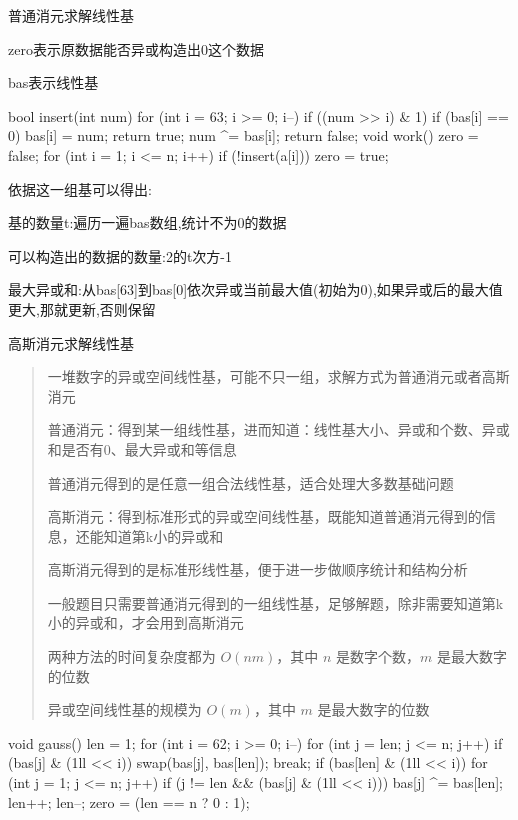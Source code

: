 \documentclass[UTF8,a4paper,11pt]{ctexart}
\newcommand{\topic}[1]{%
  \par\needspace{3\baselineskip}\vspace{0.45em}%
  \noindent{\bfseries\color{Primary}#1}\par\vspace{0.12em}%
}
\begin{document}
普通消元求解线性基

\topic{普通消元}

zero表示原数据能否异或构造出0这个数据

bas表示线性基

\begin{CodeBlock}
bool insert(int num) {
    for (int i = 63; i >= 0; i--) {
        if ((num >> i) & 1) {
            if (bas[i] == 0) {
                bas[i] = num;
                return true;
            }
            num ^= bas[i];
        }
    }
    return false;
}
void work() {
    zero = false;
    for (int i = 1; i <= n; i++) {
        if (!insert(a[i]))
            zero = true;
    }
}
\end{CodeBlock}

依据这一组基可以得出:

基的数量t:遍历一遍bas数组,统计不为0的数据

可以构造出的数据的数量:2的t次方-1

最大异或和:从bas[63]到bas[0]依次异或当前最大值(初始为0),如果异或后的最大值更大,那就更新,否则保留

高斯消元求解线性基

\topic{高斯消元}

\begin{quote}
一堆数字的异或空间线性基，可能不只一组，求解方式为普通消元或者高斯消元\par
普通消元：得到某一组线性基，进而知道：线性基大小、异或和个数、异或和是否有0、最大异或和等信息\par
普通消元得到的是任意一组合法线性基，适合处理大多数基础问题\par
高斯消元：得到标准形式的异或空间线性基，既能知道普通消元得到的信息，还能知道第k小的异或和\par
高斯消元得到的是标准形线性基，便于进一步做顺序统计和结构分析\par
一般题目只需要普通消元得到的一组线性基，足够解题，除非需要知道第k小的异或和，才会用到高斯消元\par
两种方法的时间复杂度都为 $O(nm)$，其中 $n$ 是数字个数，$m$ 是最大数字的位数\par
异或空间线性基的规模为 $O(m)$，其中 $m$ 是最大数字的位数\par
\end{quote}

\begin{CodeBlock}
void gauss() {
    len = 1;
    for (int i = 62; i >= 0; i--) {
        for (int j = len; j <= n; j++) {
            if (bas[j] & (1ll << i)) {
                swap(bas[j], bas[len]);
                break;
            }
        }
        if (bas[len] & (1ll << i)) {
            for (int j = 1; j <= n; j++) {
                if (j != len && (bas[j] & (1ll << i)))
                    bas[j] ^= bas[len];
            }
            len++;
        }
    }
    len--;
    zero = (len == n ? 0 : 1);
}
\end{CodeBlock}
\end{document}
